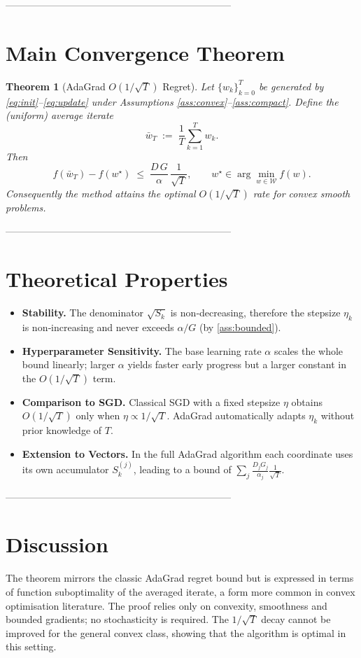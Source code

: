 \documentclass{article}
\newtheorem{theorem}{Theorem}
\begin{document}
---------------------------------------------------------------------

\section*{Main Convergence Theorem}
\begin{theorem}[AdaGrad $O(1/\sqrt{T})$ Regret]\label{thm:regret}
Let $\{w_k\}_{k=0}^{T}$ be generated by \eqref{eq:init}–\eqref{eq:update}
under Assumptions \ref{ass:convex}–\ref{ass:compact}.
Define the (uniform) average iterate
\[
\bar w_T \;:=\; \frac1T\sum_{k=1}^{T} w_k .
\]
Then
\[
f(\bar w_T)-f(w^\star)
\;\le\;
\frac{D\,G}{\alpha}\,\frac{1}{\sqrt{T}} ,
\qquad
w^\star\in\arg\min_{w\in\mathcal{W}} f(w) .
\]
Consequently the method attains the optimal $O(1/\sqrt{T})$ rate for convex
smooth problems.
\end{theorem}

---------------------------------------------------------------------

\section*{Theoretical Properties}
\begin{itemize}
\item \textbf{Stability.} The denominator $\sqrt{S_k}$ is non‑decreasing,
   therefore the stepsize $\eta_k$ is non‑increasing and never exceeds
   $\alpha/G$ (by \ref{ass:bounded}).
\item \textbf{Hyperparameter Sensitivity.} The base learning rate $\alpha$
   scales the whole bound linearly; larger $\alpha$ yields faster early
   progress but a larger constant in the $O(1/\sqrt{T})$ term.
\item \textbf{Comparison to SGD.} Classical SGD with a fixed stepsize
   $\eta$ obtains $O(1/\sqrt{T})$ only when $\eta\propto 1/\sqrt{T}$.
   AdaGrad automatically adapts $\eta_k$ without prior knowledge of $T$.
\item \textbf{Extension to Vectors.} In the full AdaGrad algorithm each
   coordinate uses its own accumulator $S_{k}^{(j)}$, leading to
   a bound of $\sum_{j}\frac{D_j G_j}{\alpha_j}\frac{1}{\sqrt{T}}$.
\end{itemize}

---------------------------------------------------------------------

\section*{Discussion}
The theorem mirrors the classic AdaGrad regret bound but is expressed
in terms of function suboptimality of the averaged iterate, a form more
common in convex optimisation literature. The proof relies only on convexity,
smoothness and bounded gradients; no stochasticity is required. The
$1/\sqrt{T}$ decay cannot be improved for the general convex class, showing
that the algorithm is optimal in this setting.
\end{document}
